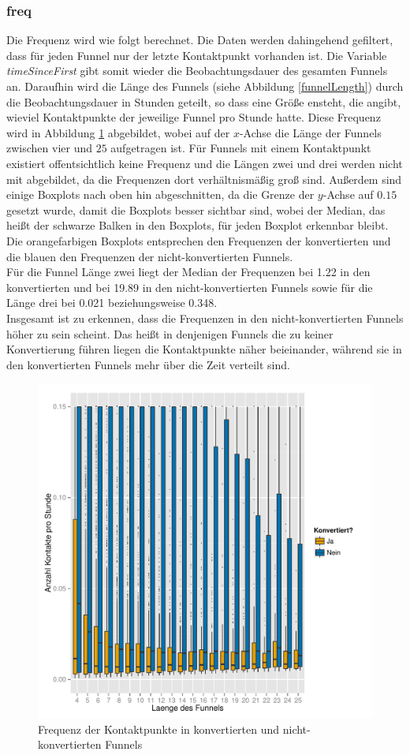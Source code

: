 \subsubsection*{freq}
Die Frequenz wird wie folgt berechnet. Die Daten werden dahingehend gefiltert, dass für jeden Funnel nur der letzte Kontaktpunkt vorhanden ist. Die Variable \textit{timeSinceFirst} gibt somit wieder die Beobachtungsdauer des gesamten Funnels an. Daraufhin wird die Länge des Funnels (siehe Abbildung \ref{funnelLength}) durch die Beobachtungsdauer in Stunden geteilt, so dass eine Größe ensteht, die angibt, wieviel Kontaktpunkte der jeweilige Funnel pro Stunde hatte. Diese Frequenz wird in Abbildung \ref{freq} abgebildet, wobei auf der $x$-Achse die Länge der Funnels zwischen vier und $25$ aufgetragen ist. Für Funnels mit einem Kontaktpunkt existiert offentsichtlich keine Frequenz und die Längen zwei und drei werden nicht mit abgebildet, da die Frequenzen dort verhältnismäßig groß sind. Außerdem sind einige Boxplots nach oben hin abgeschnitten, da die Grenze der $y$-Achse auf $0.15$ gesetzt wurde, damit die Boxplots besser sichtbar sind, wobei der Median, das heißt der schwarze Balken in den Boxplots, für jeden Boxplot erkennbar bleibt. Die orangefarbigen Boxplots entsprechen den Frequenzen der konvertierten und die blauen den Frequenzen der nicht-konvertierten Funnels.\\
Für die Funnel Länge zwei liegt der Median der Frequenzen bei 1.22 in den konvertierten und bei 19.89 in den nicht-konvertierten Funnels sowie für die Länge drei bei 0.021 beziehungsweise 0.348.\\
Insgesamt ist zu erkennen, dass die Frequenzen in den nicht-konvertierten Funnels höher zu sein scheint. Das heißt in denjenigen Funnels die zu keiner Konvertierung führen liegen die Kontaktpunkte näher beieinander, während sie in den konvertierten Funnels mehr über die Zeit verteilt sind.\\
\begin{figure}[H]
		\centering
	\includegraphics[scale=0.6]{freq.pdf}
	\caption[Frequenz der Kontaktpunkte]{Frequenz der Kontaktpunkte in konvertierten und nicht-konvertierten Funnels}
	\label{freq}
\end{figure}
